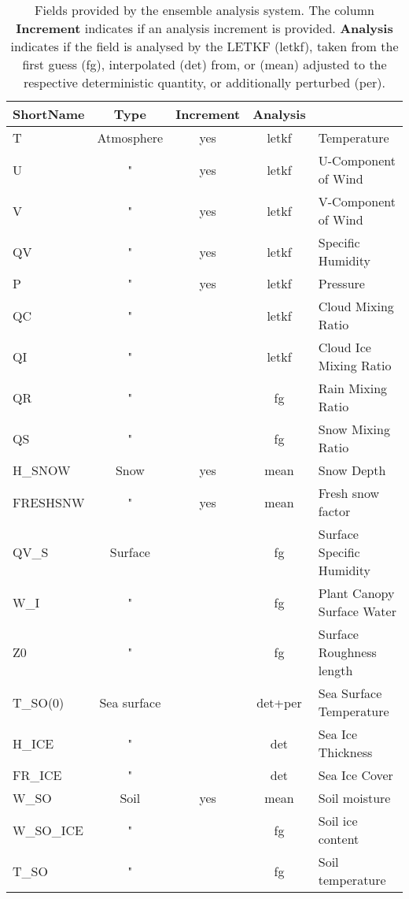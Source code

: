 \begin{longtable}{lcccl}
  \caption[]{Fields provided by the ensemble analysis system. The
      column \textbf{Increment} indicates if an analysis increment is
      provided. \textbf{Analysis} indicates if the field is analysed
      by the LETKF (letkf), taken from the first guess (fg),
      interpolated (det) from, or (mean) adjusted to the respective
      deterministic quantity, or additionally perturbed (per).}\\
\toprule 
\textbf{ShortName} & \textbf{Type}& \textbf{Increment}& \textbf{Analysis}& \\
\midrule
T          & Atmosphere  & yes  & letkf   & Temperature                 \\
U          &      "      & yes  & letkf   & U-Component of Wind         \\
V          &      "      & yes  & letkf   & V-Component of Wind         \\
QV         &      "      & yes  & letkf   & Specific Humidity           \\
P          &      "      & yes  & letkf   & Pressure                    \\
QC         &      "      &      & letkf   & Cloud Mixing Ratio          \\
QI         &      "      &      & letkf   & Cloud Ice Mixing Ratio      \\
QR         &      "      &      & fg      & Rain Mixing Ratio           \\
QS         &      "      &      & fg      & Snow Mixing Ratio           \\
\hline
H\_SNOW    & Snow        & yes  & mean    & Snow Depth                  \\
FRESHSNW   &  "          & yes  & mean    & Fresh snow factor           \\
\hline
QV\_S      & Surface     &      & fg      & Surface Specific Humidity   \\
W\_I       &    "        &      & fg      & Plant Canopy Surface Water  \\
Z0         &    "        &      & fg      & Surface Roughness length    \\
\hline
T\_SO(0)   & Sea surface &      & det+per & Sea Surface Temperature     \\
H\_ICE     &    "        &      & det     & Sea Ice Thickness           \\
FR\_ICE    &    "        &      & det     & Sea Ice Cover               \\
\hline
W\_SO      & Soil        & yes  & mean    & Soil moisture               \\
W\_SO\_ICE &    "        &      & fg      & Soil ice content            \\
T\_SO      &    "        &      & fg      & Soil temperature            \\
\bottomrule
\end{longtable}


